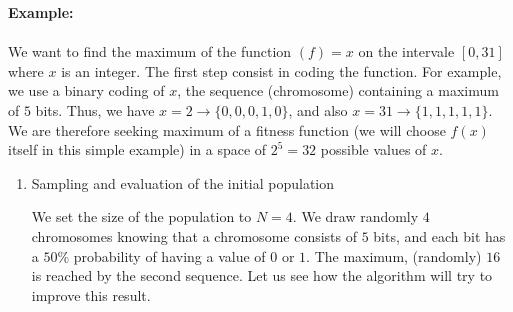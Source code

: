 	\begin{tcolorbox}[colframe=black,colback=white,sharp corners]
	\textbf{{\Large {}}Example:}\\\\
	We want to find the maximum of the function $(f)=x$ on the intervale $[0,31]$ where $x$ is an integer. The first step consist in coding the function. For example, we use a binary coding of $x$, the sequence (chromosome) containing a maximum of $5$ bits. Thus, we have $x=2\rightarrow \{0,0,0,1,0\}$, and also $x=31\rightarrow \{1,1,1,1,1\}$. We are therefore seeking maximum of a fitness function (we will choose $f(x)$ itself in this simple example) in a space of $2^5=32$ possible values of $x$.
	\begin{enumerate}
		\item Sampling and evaluation of the initial population

		We set the size of the population to $N=4$. We draw randomly $4$ chromosomes knowing that a chromosome consists of $5$ bits, and each bit has a $50\%$ probability of having a value of $0$ or $1$. The maximum, (randomly) $16$ is reached by the second sequence. Let us see how the algorithm will try to improve this result.


\end{enumerate}
\end{tcolorbox}
